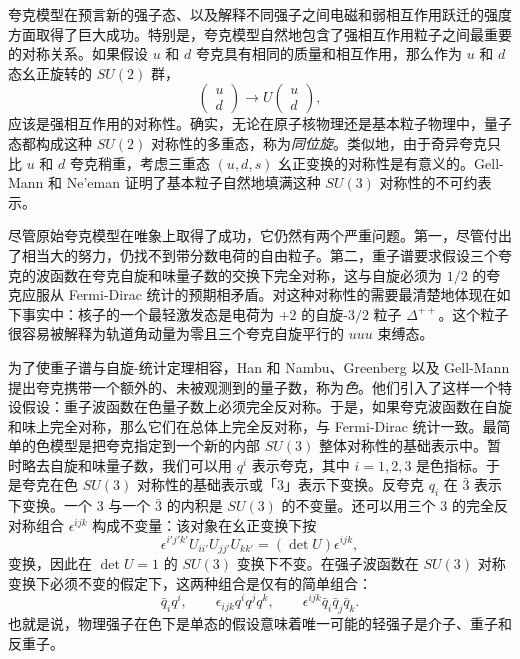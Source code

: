 夸克模型在预言新的强子态、以及解释不同强子之间电磁和弱相互作用跃迁的强度方面取得了巨大成功。特别是，夸克模型自然地包含了强相互作用粒子之间最重要的对称关系。如果假设 $u$ 和 $d$ 夸克具有相同的质量和相互作用，那么作为 $u$ 和 $d$ 态幺正旋转的 $SU(2)$ 群，
\begin{equation}
  \begin{pmatrix}u\\ d\end{pmatrix} \to U\begin{pmatrix}u\\ d\end{pmatrix},
  \label{eq:17.1}
\end{equation}
应该是强相互作用的对称性。确实，无论在原子核物理还是基本粒子物理中，量子态都构成这种 $SU(2)$ 对称性的多重态，称为\emph{同位旋}。类似地，由于奇异夸克只比 $u$ 和 $d$ 夸克稍重，考虑三重态 $(u, d, s)$ 幺正变换的对称性是有意义的。Gell-Mann 和 Ne'eman 证明了基本粒子自然地填满这种 $SU(3)$ 对称性的不可约表示。

尽管原始夸克模型在唯象上取得了成功，它仍然有两个严重问题。第一，尽管付出了相当大的努力，仍找不到带分数电荷的自由粒子。第二，重子谱要求假设三个夸克的波函数在夸克自旋和味量子数的交换下完全对称，这与自旋必须为 $1/2$ 的夸克应服从 Fermi-Dirac 统计的预期相矛盾。对这种对称性的需要最清楚地体现在如下事实中：核子的一个最轻激发态是电荷为 $+2$ 的自旋-$3/2$ 粒子 $\Delta^{++}$。这个粒子很容易被解释为轨道角动量为零且三个夸克自旋平行的 $uuu$ 束缚态。

为了使重子谱与自旋-统计定理相容，Han 和 Nambu、Greenberg 以及 Gell-Mann 提出夸克携带一个额外的、未被观测到的量子数，称为\emph{色}。他们引入了这样一个特设假设：重子波函数在色量子数上必须完全反对称。于是，如果夸克波函数在自旋和味上完全对称，那么它们在总体上完全反对称，与 Fermi-Dirac 统计一致。最简单的色模型是把夸克指定到一个新的内部 $SU(3)$ 整体对称性的基础表示中。暂时略去自旋和味量子数，我们可以用 $q^i$ 表示夸克，其中 $i = 1, 2, 3$ 是色指标。于是夸克在色 $SU(3)$ 对称性的基础表示或「3」表示下变换。反夸克 $q_i$ 在 $\bar{3}$ 表示下变换。一个 3 与一个 $\bar{3}$ 的内积是 $SU(3)$ 的不变量。还可以用三个 3 的完全反对称组合 $\epsilon^{ijk}$ 构成不变量：该对象在幺正变换下按
\begin{equation}
  \epsilon^{i'j'k'}U_{ii'}U_{jj'}U_{kk'} = (\det U)\epsilon^{ijk} ,
  \label{eq:17.2}
\end{equation}
变换，因此在 $\det U = 1$ 的 $SU(3)$ 变换下不变。在强子波函数在 $SU(3)$ 对称变换下必须不变的假定下，这两种组合是仅有的简单组合：
\begin{equation}
  \bar{q}_i q^i,\qquad \epsilon_{ijk}q^i q^j q^k,\qquad
  \epsilon^{ijk}\bar{q}_i\bar{q}_j\bar{q}_k .
  \label{eq:17.3}
\end{equation}
也就是说，物理强子在色下是单态的假设意味着唯一可能的轻强子是介子、重子和反重子。

